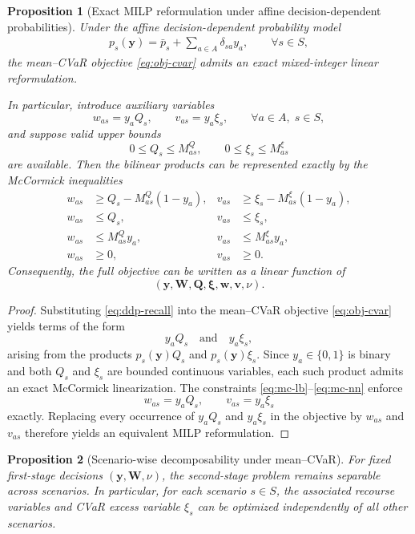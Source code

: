 \documentclass[final,3p,authoryear]{elsarticle}
\newtheorem{proposition}{Proposition}
\theoremstyle{definition}
\begin{document}
\begin{proposition}[Exact MILP reformulation under affine decision-dependent probabilities]
\label{prop:milp-reform}
Under the affine decision-dependent probability model
\begin{align}
p_s(\mathbf{y}) = \bar p_s + \sum_{a \in A} \delta_{sa} y_a,
\qquad \forall s \in S,
\label{eq:ddp-recall}
\end{align}
the mean--CVaR objective \eqref{eq:obj-cvar} admits an exact mixed-integer
linear reformulation.

In particular, introduce auxiliary variables
\[
w_{as} = y_a Q_s, \qquad v_{as} = y_a \xi_s,
\qquad \forall a \in A,\; s \in S,
\]
and suppose valid upper bounds
\[
0 \le Q_s \le M_{as}^Q, \qquad 0 \le \xi_s \le M_{as}^{\xi}
\]
are available. Then the bilinear products can be represented exactly by
the McCormick inequalities
\begin{align}
w_{as} &\ge Q_s - M_{as}^Q(1-y_a), &
v_{as} &\ge \xi_s - M_{as}^{\xi}(1-y_a),
\label{eq:mc-lb} \\
w_{as} &\le Q_s, &
v_{as} &\le \xi_s,
\label{eq:mc-ub1} \\
w_{as} &\le M_{as}^Q y_a, &
v_{as} &\le M_{as}^{\xi} y_a,
\label{eq:mc-ub2} \\
w_{as} &\ge 0, &
v_{as} &\ge 0.
\label{eq:mc-nn}
\end{align}
Consequently, the full objective can be written as a linear function of
\[
(\mathbf y,\mathbf W,\mathbf Q,\boldsymbol{\xi},
\mathbf w,\mathbf v,\nu).
\]
\end{proposition}

\begin{proof}
Substituting \eqref{eq:ddp-recall} into the mean--CVaR objective
\eqref{eq:obj-cvar} yields terms of the form
\[
y_a Q_s
\quad\text{and}\quad
y_a \xi_s,
\]
arising from the products $p_s(\mathbf y)Q_s$ and
$p_s(\mathbf y)\xi_s$. Since $y_a \in \{0,1\}$ is binary and both
$Q_s$ and $\xi_s$ are bounded continuous variables, each such product
admits an exact McCormick linearization. The constraints
\eqref{eq:mc-lb}--\eqref{eq:mc-nn} enforce
\[
w_{as}=y_aQ_s, \qquad v_{as}=y_a\xi_s
\]
exactly. Replacing every occurrence of $y_aQ_s$ and $y_a\xi_s$ in the
objective by $w_{as}$ and $v_{as}$ therefore yields an equivalent MILP
reformulation. 
\end{proof}

\begin{proposition}[Scenario-wise decomposability under mean--CVaR]
\label{prop:cvar-decomp}
For fixed first-stage decisions $(\mathbf{y}, \mathbf{W}, \nu)$, the
second-stage problem remains separable across scenarios. In particular,
for each scenario $s \in S$, the associated recourse variables and CVaR
excess variable $\xi_s$ can be optimized independently of all other
scenarios.
\end{proposition}
\end{document}
